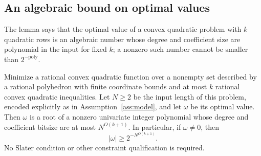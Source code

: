\subsection{An algebraic bound on optimal values}
The lemma says that the optimal value of a convex quadratic problem with
$k$ quadratic rows is an algebraic number whose degree and coefficient
size are polynomial in the input for fixed $k$; a nonzero such number
cannot be smaller than $2^{-\mathrm{poly}}$.

\begin{lemma}\label{lem:nonzerovalue}
Minimize a rational convex quadratic function over a nonempty set
described by a rational polyhedron with finite coordinate bounds and at
most $k$ rational convex quadratic inequalities. Let $N\ge2$ be the input
length of this problem, encoded explicitly as in
Assumption~\ref{ass:model}, and let $\omega$ be its optimal value. Then
$\omega$ is a root of a nonzero univariate integer polynomial whose degree
and coefficient bitsize are at most $N^{O(k+1)}$. In particular, if
$\omega\ne0$, then
\begin{equation}\label{eq:nonzero}
 |\omega|\ge2^{-N^{O(k+1)}}.
\end{equation}
No Slater condition or other constraint qualification is required.
\end{lemma}

